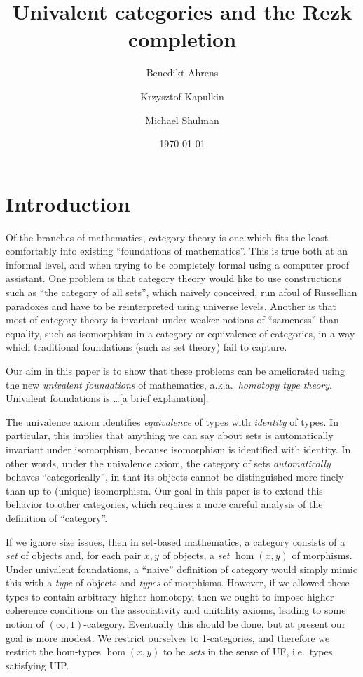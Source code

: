 \documentclass{amsart}
\title{Univalent categories and the Rezk completion}
\author{Benedikt Ahrens}
\author{Krzysztof Kapulkin}
\author{Michael Shulman}
\date{\today}
\theoremstyle{definition}
\theoremstyle{remark}
\numberwithin{equation}{section}
\begin{document}
\maketitle

\section{Introduction}
\label{sec:introduction}

Of the branches of mathematics, category theory is one which fits the least comfortably into existing ``foundations of mathematics''.
This is true both at an informal level, and when trying to be completely formal using a computer proof assistant.
One problem is that category theory would like to use constructions such as ``the category of all sets'', which naively conceived, run afoul of Russellian paradoxes and have to be reinterpreted using universe levels.
Another is that most of category theory is invariant under weaker notions of ``sameness'' than equality, such as isomorphism in a category or equivalence of categories, in a way which traditional foundations (such as set theory) fail to capture.

Our aim in this paper is to show that these problems can be ameliorated using the new \emph{univalent foundations} of mathematics, a.k.a.\ \emph{homotopy type theory}.
Univalent foundations is \dots [a brief explanation].

The univalence axiom identifies \emph{equivalence} of types with \emph{identity} of types.
In particular, this implies that anything we can say about sets is automatically invariant under isomorphism, because isomorphism is identified with identity.
In other words, under the univalence axiom, the category of sets \emph{automatically} behaves ``categorically'', in that its objects cannot be distinguished more finely than up to (unique) isomorphism.
Our goal in this paper is to extend this behavior to other categories, which requires a more careful analysis of the definition of ``category''.

If we ignore size issues, then in set-based mathematics, a category consists of a \emph{set} of objects and, for each pair $x,y$ of objects, a \emph{set} $\hom(x,y)$ of morphisms.
Under univalent foundations, a ``naive'' definition of category would simply mimic this with a \emph{type} of objects and \emph{types} of morphisms.
However, if we allowed these types to contain arbitrary higher homotopy, then we ought to impose higher coherence conditions on the associativity and unitality axioms, leading to some notion of $(\infty,1)$-category.
Eventually this should be done, but at present our goal is more modest.
We restrict ourselves to 1-categories, and therefore we restrict the hom-types $\hom(x,y)$ to be \emph{sets} in the sense of UF, i.e.\ types satisfying UIP.
\end{document}
